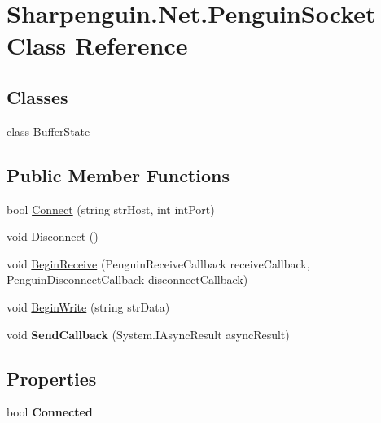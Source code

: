 \hypertarget{classSharpenguin_1_1Net_1_1PenguinSocket}{\section{\-Sharpenguin.\-Net.\-Penguin\-Socket \-Class \-Reference}
\label{classSharpenguin_1_1Net_1_1PenguinSocket}
}
\subsection*{\-Classes}
\begin{DoxyCompactItemize}
\item 
class \hyperlink{classSharpenguin_1_1Net_1_1PenguinSocket_1_1BufferState}{\-Buffer\-State}
\end{DoxyCompactItemize}
\subsection*{\-Public \-Member \-Functions}
\begin{DoxyCompactItemize}
\item 
bool \hyperlink{classSharpenguin_1_1Net_1_1PenguinSocket_a024e4bbf684a0e2a279c477174e1c5d2}{\-Connect} (string str\-Host, int int\-Port)
\item 
void \hyperlink{classSharpenguin_1_1Net_1_1PenguinSocket_ac60926b98466d10e0db01bd48c4b4ad8}{\-Disconnect} ()
\item 
void \hyperlink{classSharpenguin_1_1Net_1_1PenguinSocket_af55abe0b108fa3b4e94e20a639812b32}{\-Begin\-Receive} (\-Penguin\-Receive\-Callback receive\-Callback, \-Penguin\-Disconnect\-Callback disconnect\-Callback)
\item 
void \hyperlink{classSharpenguin_1_1Net_1_1PenguinSocket_a1a22198956191adbdfcd2649d141f8f6}{\-Begin\-Write} (string str\-Data)
\item 
\hypertarget{classSharpenguin_1_1Net_1_1PenguinSocket_a08bb8907688a36801115b1797aca2542}{void {\bfseries \-Send\-Callback} (\-System.\-I\-Async\-Result async\-Result)}\label{classSharpenguin_1_1Net_1_1PenguinSocket_a08bb8907688a36801115b1797aca2542}

\end{DoxyCompactItemize}
\subsection*{\-Properties}
\begin{DoxyCompactItemize}
\item 
\hypertarget{classSharpenguin_1_1Net_1_1PenguinSocket_aebcbb81e484814de900b1254e0798717}{bool {\bfseries \-Connected}}\label{classSharpenguin_1_1Net_1_1PenguinSocket_aebcbb81e484814de900b1254e0798717}

\end{DoxyCompactItemize}


